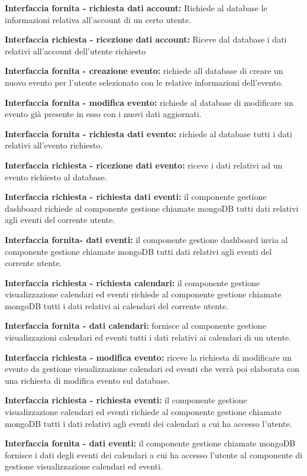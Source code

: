 \begin{listaPersonale}[]{}
    \textbf{Interfaccia fornita - richiesta dati account:} Richiede al database le informazioni relativa all'account di un certo utente.

    \textbf{Interfaccia richiesta - ricezione dati account:} Riceve dal database i dati relativi all'account dell'utente richiesto

    \textbf{Interfaccia fornita - creazione evento:} richiede all database di creare un nuovo evento per l'utente selezionato con le relative informazioni dell'evento.

    \textbf{Interfaccia fornita - modifica evento:} richiede al database di modificare un evento già presente in esso con i nuovi dati aggiornati.

    \textbf{Interfaccia fornita - richiesta dati evento:} richiede al database tutti i dati relativi all'evento richiesto.

    \textbf{Interfaccia richiesta - ricezione dati evento:} riceve i dati relativi ad un evento richiesto al database.

    \textbf{Interfaccia richiesta - richiesta dati eventi:} il componente gestione dashboard richiede al componente gestione chiamate mongoDB tutti dati relativi agli eventi del corrente utente.

    \textbf{Interfaccia fornita- dati eventi:} il componente gestione dashboard invia al componente gestione chiamate mongoDB tutti dati relativi agli eventi del corrente utente.

    \textbf{Interfaccia richiesta - richiesta calendari:} il componente gestione visualizzazione calendari ed eventi richiede al componente gestione chiamate mongoDB tutti i dati relativi ai calendari del corrente utente.

    \textbf{Interfaccia fornita - dati calendari:} fornisce al componente gestione visualizzazioni calendari ed eventi tutti i dati relativi ai calendari di un utente.

    \textbf{Interfaccia richiesta - modifica evento:} riceve la richiesta di modificare un evento da gestione visualizzazione calendari ed eventi che verrà poi elaborata con una richiesta di modifica evento sul database.

    \textbf{Interfaccia richiesta - richiesta eventi:} il componente gestione visualizzazione calendari ed eventi richiede al componente gestione chiamate mongoDB tutti i dati relativi agli eventi dei calendari a cui ha accesso l'utente.

    \textbf{Interfaccia fornita - dati eventi:} il componente gestione chiamate mongoDB fornisce i dati degli eventi dei calendari a cui ha accesso l'utente al componente di gestione visualizzazione calendari ed eventi.


\end{listaPersonale}
